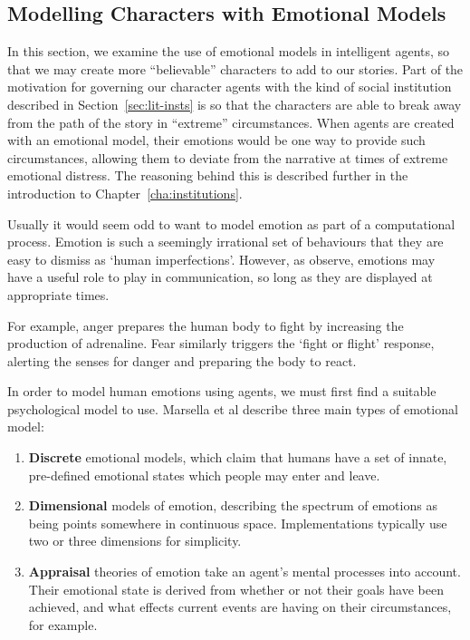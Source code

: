 \documentclass[11pt]{report}
\begin{document}
\subsection{Modelling Characters with Emotional Models}\label{sec:emotional-models}
In this section, we examine the use of emotional models in intelligent agents,
so that we may create more ``believable'' characters to add to our stories. Part
of the motivation for governing our character agents with the kind of social
institution described in Section~\ref{sec:lit-insts} is so that the characters
are able to break away from the path of the story in ``extreme'' circumstances.
When agents are created with an emotional model, their emotions would be one way
to provide such circumstances, allowing them to deviate from the narrative at
times of extreme emotional distress. The reasoning behind this is described further in the introduction to
Chapter~\ref{cha:institutions}.

Usually it would seem odd to want to model emotion as part of a computational process. Emotion is such a seemingly irrational set of behaviours that they are easy to dismiss as `human imperfections'. However, as \citet{gratch2004domain} observe, emotions may have a useful role to play in communication, so long as they are displayed at appropriate times.

For example, anger prepares the human body to fight by increasing the production of adrenaline. Fear similarly triggers the `fight or flight' response, alerting the senses for danger and preparing the body to react.

In order to model human emotions using agents, we must first find a suitable psychological model to use. Marsella et al describe three main types of emotional model:

\begin{enumerate}
 \item \textbf{Discrete} emotional models, which claim that humans have a set of innate, pre-defined emotional states which people may enter and leave.
 \item \textbf{Dimensional} models of emotion, describing the spectrum of emotions as being points somewhere in continuous space. Implementations typically use two or three dimensions for simplicity.
 \item \textbf{Appraisal} theories of emotion take an agent's mental processes into account. Their emotional state is derived from whether or not their goals have been achieved, and what effects current events are having on their circumstances, for example.
\end{enumerate}
\end{document}
